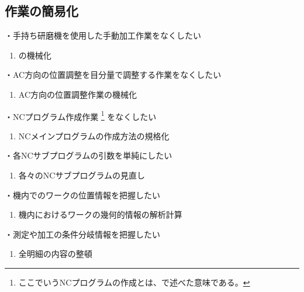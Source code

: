 \subsection{\EndFaceChamferMilling 作業の簡易化}
・手持ち研磨機を使用した手動加工作業をなくしたい
\begin{enumerate}[label=\sarrow]
\item \EndFaceChamferMilling の機械化
\end{enumerate}
・AC方向の位置調整を目分量で調整する作業をなくしたい
\begin{enumerate}[label=\sarrow]
\item AC方向の位置調整作業の機械化
\end{enumerate}



\clearpage
・NCプログラム作成作業%
\footnote{ここでいうNCプログラムの作成とは、で述べた意味である。}
をなくしたい
\begin{enumerate}[label=\sarrow]
\item {}NCメインプログラムの作成方法の規格化
\end{enumerate}
・各NCサブプログラムの引数を単純にしたい
\begin{enumerate}[label=\sarrow]
\item 各々のNCサブプログラムの見直し
\end{enumerate}



・機内でのワークの位置情報を把握したい
\begin{enumerate}[label=\sarrow]
\item 機内におけるワークの幾何的情報の解析計算
\end{enumerate}
・測定や加工の条件分岐情報を把握したい
\begin{enumerate}[label=\sarrow]
\item 全明細の内容の整頓
\end{enumerate}




